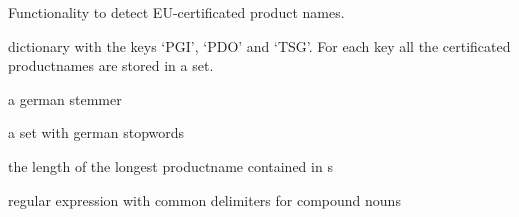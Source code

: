 \documentclass[letterpaper,10pt,english]{sphinxmanual}
\begin{document}
\begin{fulllineitems}
\label{\detokenize{api:geoschutz_check.Geoschutz}}
Functionality to detect EU-certificated product names.

\begin{fulllineitems}
\label{\detokenize{api:geoschutz_check.Geoschutz.s}}
dictionary with the keys ‘PGI’, ‘PDO’ and ‘TSG’. For each key
all the certificated productnames are stored in a set.

\end{fulllineitems}


\begin{fulllineitems}
\label{\detokenize{api:geoschutz_check.Geoschutz.stemmer}}
a german stemmer

\end{fulllineitems}


\begin{fulllineitems}
\label{\detokenize{api:geoschutz_check.Geoschutz.stop_words}}
a set with german stopwords

\end{fulllineitems}


\begin{fulllineitems}
\label{\detokenize{api:geoschutz_check.Geoschutz.max_n}}
the length of the longest productname contained in s

\end{fulllineitems}


\begin{fulllineitems}
\label{\detokenize{api:geoschutz_check.Geoschutz.compound_reg}}
regular expression with common delimiters for
compound nouns


\end{fulllineitems}
\end{fulllineitems}
\end{document}
